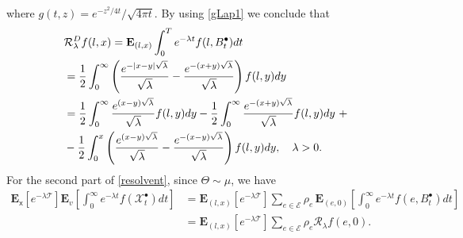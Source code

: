 \documentclass[11pt,a4paper]{article}
\theoremstyle{plain}
\theoremstyle{definition}
\theoremstyle{remark}
\begin{document}
		where $g(t, z) = e^{-z^2/ 4t}/\sqrt{4 \pi t}$. By using \eqref{gLap1}
		we conclude that
		\begin{align}
			\label{resolvent1}
			&\mathcal{R}^D_\lambda f(l,x)=\mathbf{E}_{(l,x)}\int_0^{T} e^{-\lambda t} f(l, B^\bullet_t) dt \notag \\
			&=\frac{1}{2}\int_0^\infty \left(\frac{e^{-\vert x-y \vert \sqrt \lambda}}{\sqrt \lambda}- \frac{e^{-( x+y)  \sqrt \lambda}}{\sqrt \lambda}\right) f(l,y) dy\notag\\
			&=\frac{1}{2} \int_0^\infty \frac{e^{( x-y)  \sqrt \lambda}}{\sqrt \lambda} f(l,y) dy - \frac{1}{2} \int_0^\infty \frac{e^{-( x+y)  \sqrt \lambda}}{\sqrt \lambda} f(l,y) dy\ +\notag\\
			&- \frac{1}{2} \int_0^x \left(\frac{e^{( x-y)  \sqrt \lambda}}{\sqrt \lambda} - \frac{e^{-( x-y)  \sqrt \lambda}}{\sqrt \lambda} \right) f(l,y) dy, \quad \lambda>0.
		\end{align}
		For the second part of \eqref{resolvent}, since $\Theta \sim \mu$, we have
		\begin{align*}
			\mathbf{E}_\mathsf{x}\left[e^{-\lambda \mathcal{T}}\right] \mathbf{E}_v\left[\int_{0}^{\infty} e^{-\lambda t} f(\mathcal{X}^\bullet_t) dt  \right]&=\mathbf{E}_{(l, x)}\left[e^{-\lambda \mathcal{T}}\right] \sum_{e \in \mathcal{E}} \rho_e \, \mathbf{E}_{(e,0)}  \left[\int_0^\infty e^{-\lambda t} f(e, B^\bullet_t) dt\right]\\
			&= \mathbf{E}_{(l, x)}\left[e^{-\lambda \mathcal{T}}\right] \sum_{e \in \mathcal{E}} \rho_e {\mathcal{R}}_\lambda f(e,0).
		\end{align*}
\end{document}
